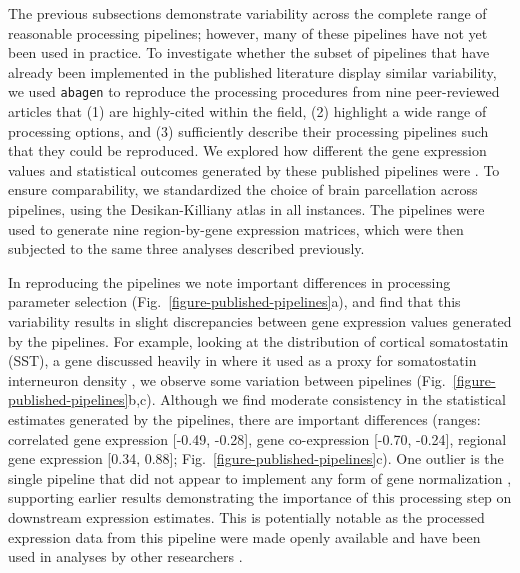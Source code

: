 \documentclass[12pt,aps,pra,reprint,showkeys]{revtex4-1}
\begin{document}
The previous subsections demonstrate variability across the complete range of reasonable processing pipelines; however, many of these pipelines have not yet been used in practice.
To investigate whether the subset of pipelines that have already been implemented in the published literature display similar variability, we used \texttt{abagen} to reproduce the processing procedures from nine peer-reviewed articles that (1) are highly-cited within the field, (2) highlight a wide range of processing options, and (3) sufficiently describe their processing pipelines such that they could be reproduced.
We explored how different the gene expression values and statistical outcomes generated by these published pipelines were \citep{hawrylycz2015natneuro, french2015frontneurosci, whitakervertes2016pnas, krienen2016pnas, anderson2018natcomm, burt2018natneuro, romerogarcia2018neuroimage, anderson2020pnas, liu2020neuroimage}.
To ensure comparability, we standardized the choice of brain parcellation across pipelines, using the Desikan-Killiany atlas in all instances.
The pipelines were used to generate nine region-by-gene expression matrices, which were then subjected to the same three analyses described previously.

In reproducing the pipelines we note important differences in processing parameter selection (Fig.~\ref{figure-published-pipelines}a), and find that this variability results in slight discrepancies between gene expression values generated by the pipelines.
For example, looking at the distribution of cortical somatostatin (SST), a gene discussed heavily in \citet{anderson2020pnas} where it used as a proxy for somatostatin interneuron density \citep[cf.][]{fulcher2019jexpneuro}, we observe some variation between pipelines (Fig.~\ref{figure-published-pipelines}b,c).
Although we find moderate consistency in the statistical estimates generated by the pipelines, there are important differences (ranges: correlated gene expression [-0.49, -0.28], gene co-expression [-0.70, -0.24], regional gene expression [0.34, 0.88]; Fig.~\ref{figure-published-pipelines}c).
One outlier is the single pipeline that did not appear to implement any form of gene normalization \citep{french2015frontneurosci}, supporting earlier results demonstrating the importance of this processing step on downstream expression estimates.
This is potentially notable as the processed expression data from this pipeline were made openly available and have been used in analyses by other researchers \citep[e.g.,][]{sepulcre2018natmed, beliveau2017jneuro}.
\end{document}
